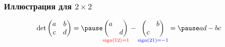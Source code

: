\begin{frame}
    \frametitle{Иллюстрация для $2\times 2$}

    \[
    \det \begin{pmatrix}
        a & b \\
        c & d \\
    \end{pmatrix} = \pause
    \underset{\red{\sign(12)=1}}{\begin{pmatrix}
        a &  \\
         & d \\
    \end{pmatrix}} - 
    \underset{\textcolor{blue}{\sign(21)=-1}}{\begin{pmatrix}
         & b \\
        c &  \\
    \end{pmatrix}} = \pause  ad - bc
    \]

\end{frame}



